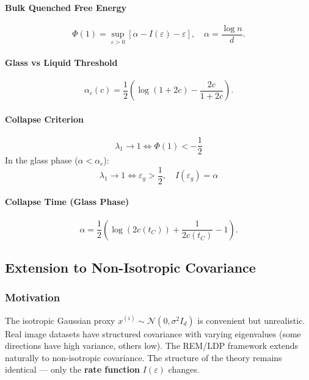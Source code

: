 \documentclass[11pt]{article}
\begin{document}
\paragraph{Bulk Quenched Free Energy}
\begin{equation}
\Phi(1) = \sup_{\varepsilon > 0}\left[\alpha - I(\varepsilon) - \varepsilon\right], \quad \alpha = \frac{\log n}{d}.
\end{equation}

\paragraph{Glass vs Liquid Threshold}
\begin{equation}
\alpha_c(c)=\frac{1}{2}\left(\log(1+2c)-\frac{2c}{1+2c}\right).
\end{equation}

\paragraph{Collapse Criterion}
\begin{equation}
\lambda_1 \to 1 \iff \Phi(1) < -\frac{1}{2}
\end{equation}
In the glass phase ($\alpha<\alpha_c$):
\begin{equation}
\lambda_1 \to 1 \iff \varepsilon_g > \frac{1}{2}, \quad I(\varepsilon_g) = \alpha
\end{equation}

\paragraph{Collapse Time (Glass Phase)}
\begin{equation}
\alpha=\frac{1}{2}\left(\log(2c(t_C))+\frac{1}{2c(t_C)}-1\right).
\end{equation}

\subsection{Extension to Non-Isotropic Covariance}
\subsubsection{Motivation}
The isotropic Gaussian proxy $x^{(i)} \sim \mathcal{N}(0, \sigma^2 I_d)$ is convenient but unrealistic. Real image datasets have structured covariance with varying eigenvalues (some directions have high variance, others low). The REM/LDP framework extends naturally to non-isotropic covariance. The structure of the theory remains identical --- only the \textbf{rate function} $I(\varepsilon)$ changes.
\end{document}
